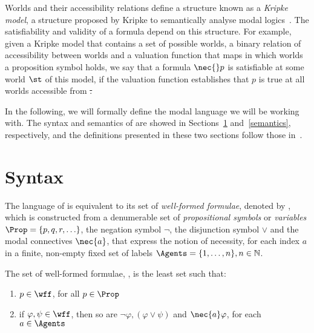Worlds and their accessibility relations define a structure known as a
\emph{Kripke model}, a structure proposed by Kripke to semantically analyse
modal logics~\cite{kripke:i}.  The satisfiability and validity of a formula
depend on this structure. For example, given a Kripke model that contains a set
of possible worlds, a binary relation of accessibility between worlds and a
valuation function that maps in which worlds a proposition symbol holds, we say
that a formula $\nec{}p$ is satisfiable at some world $\st$ of this model, if
the valuation function establishes that $p$ is true at all worlds accessible
from \st.

In the following, we will formally define the modal language we will be working with. The
syntax and semantics of  are showed in Sections~\ref{syntax}
and~\ref{semantics}, respectively, and the definitions presented in these two
sections follow those in~\cite{journals/jal/NalonD07}.

\section{Syntax}
\label{syntax}

The language of  is equivalent to its set of \emph{well-formed
formulae}, denoted by \wff, which is constructed from a denumerable set of
\emph{propositional symbols} or \emph{variables} $\Prop = \{p, q, r, \ldots\}$,
the negation symbol $\neg$, the disjunction symbol $\lor$ and the modal
connectives $\nec{a}$, that express the notion of necessity, for each index $a$
in a finite, non-empty fixed set of labels $\Agents = \{1, \ldots, n\}, n \in
\mathbb{N}$.

\begin{definition}
\label{def:wff}
    The set of well-formed formulae, \wff, is the least set such that:
    \begin{enumerate}
        \item $p \in \wff$, for all $p \in \Prop$
            \vspace{.2ex}
        \item if $\varphi, \psi \in \wff$, then so are $\neg \varphi, (\varphi
            \lor \psi)$ and $\nec{a} \varphi$, for each $a \in \Agents$
    \end{enumerate}
\end{definition}

